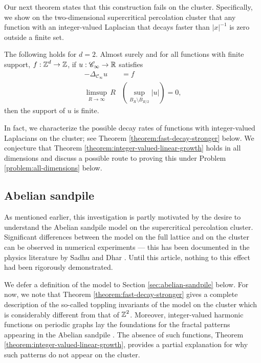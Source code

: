 \documentclass[12pt]{amsart}
\numberwithin{equation}{section}
\begin{document}
	
	Our next theorem states that this construction fails on the cluster. Specifically, we show on the two-dimensional supercritical percolation cluster that any function with an integer-valued Laplacian that decays faster than $|x|^{-1}$ is zero outside a finite set. 
	\begin{theorem} \label{theorem:fast-decay}
		The following holds for $d = 2$. Almost surely and for all functions with finite support, $f: \operatorname{\mathbb{Z}}^d \to \operatorname{\mathbb{Z}}$, if $u: \mathscr{C}_{\infty} \to \operatorname{\mathbb{R}}$ satisfies 
		\[
		\begin{aligned}
			-\Delta_{{\mathscr{C}_{\infty}}} u &= f \\ 
			\limsup_{R \to \infty} \, R &\left (\sup_{B_R \setminus B_{R/2}} |u|  \right) = 0,
		\end{aligned}
		\]
		then the support of $u$ is finite.  
	\end{theorem}
	In fact, we characterize the possible decay rates of functions with integer-valued Laplacians on the cluster; see Theorem \ref{theorem:fast-decay-stronger} below. We conjecture that Theorem \ref{theorem:integer-valued-linear-growth} holds in all dimensions and discuss a possible route to proving this under Problem \ref{problem:all-dimensions} below.  
	
	
	
	\subsection{Abelian sandpile} \label{subsec:sandpile-intro}
	As mentioned earlier, this investigation is partly motivated by the desire to understand the Abelian sandpile model \cite{levine-what-is, levine-peres-survey}
	on the supercritical percolation cluster. Significant differences between the model on the full lattice and on the cluster can be observed in numerical experiments --- this has been documented in the physics literature by Sadhu and Dhar \cite{sadhu2011effect}.  Until this article, nothing to this effect had been rigorously demonstrated. 
	
	We defer a definition of the model to Section \ref{sec:abelian-sandpile} below. For now, we note that Theorem \ref{theorem:fast-decay-stronger} gives a complete description of the so-called toppling invariants \cite{dhar-algebraic-aspects} of the model on the cluster
	which is considerably different from that of $\operatorname{\mathbb{Z}}^2$. Moreover, integer-valued harmonic functions on periodic graphs lay the foundations for the fractal patterns appearing in the Abelian sandpile \cite{pegden-smart-sandpile-2013, bourabee-sandpile-2021, apollonian-matrix, apollonian-sandpile, bou2021integer}. The absence of such functions, Theorem \ref{theorem:integer-valued-linear-growth}, provides a partial explanation for why such patterns do not appear on the cluster.
	
\end{document}
